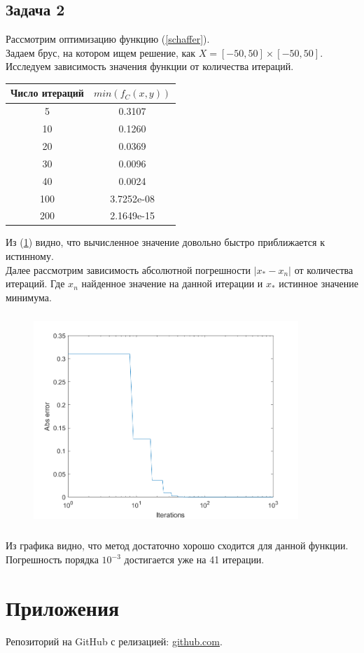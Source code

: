 \documentclass[12pt,a4paper]{scrartcl}
\begin{document}
\subsection{Задача 2}
Рассмотрим оптимизацию функцию (\ref{schaffer}).\\
Задаем брус, на котором ищем решение, как
$X = [-50, 50] \times [-50, 50]$. \\
Исследуем зависимость значения функции от количества итераций.
\begin{table}[H]
    \centering
    \begin{tabular}{| c | c |}
        \hline
         Число итераций & $min(f_{C}(x, y))$ \\ \hline
         5 & 0.3107 \\ \hline
         10 & 0.1260 \\ \hline
         20 & 0.0369 \\ \hline
         30 & 0.0096 \\ \hline
	   40 & 0.0024 \\ \hline
	   100 & 3.7252e-08 \\ \hline
         200 & 2.1649e-15 \\ \hline
    \end{tabular}
    \label{tab:tav}
\end{table}
Из (\ref{tab:tav}) видно, что вычисленное значение довольно быстро приближается к истинному.\\

Далее рассмотрим зависимость абсолютной погрешности $|x_{*} - x_{n}|$ от количества итераций. Где $x_{n}$ найденное значение на данной итерации и $x_{*}$ истинное значение минимума.
\begin{figure}[H]
    \centering
    \includegraphics[width=10cm, height=8cm]{fig/convergence.png}
\end{figure}

Из графика видно, что метод достаточно хорошо сходится для данной функции. Погрешность порядка $10^{-3}$ достигается уже на 41 итерации.

\section{Приложения}
Репозиторий на GitHub с релизацией: \href{https://github.com/WiillyWonka/Intervals}{github.com}.
\end{document}
